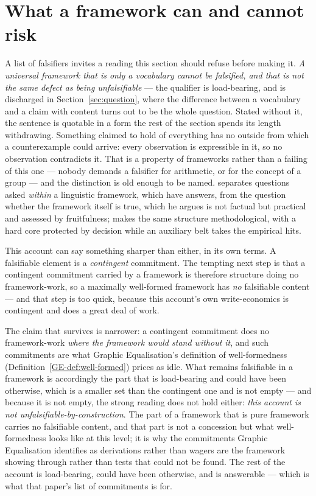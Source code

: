 \documentclass[11pt,a4paper]{article}
\begin{document}
\section{What a framework can and cannot risk}\label{sec:risk}
A list of falsifiers invites a reading this section
should refuse before making it. \emph{A universal framework that is only a vocabulary cannot be
falsified, and that is not the same defect as being unfalsifiable} --- the qualifier is load-bearing,
and is discharged in Section~\ref{sec:question}, where the difference between a vocabulary and a claim with
content turns out to be the whole question. Stated without it, the sentence is quotable in a form the rest of the section spends its length withdrawing. Something claimed to hold of everything has no outside from which
a counterexample could arrive: every observation is expressible in it, so no observation contradicts
it. That is a property of frameworks rather than a failing of this one --- nobody demands a falsifier
for arithmetic, or for the concept of a group --- and the distinction is old enough to be named.
\citet{carnap1950} separates questions asked \emph{within} a linguistic framework, which have answers,
from the question whether the framework itself is true, which he argues is not factual but practical
and assessed by fruitfulness; \citet{lakatos1970} makes the same structure methodological, with a hard
core protected by decision while an auxiliary belt takes the empirical hits.

This account can say something sharper than either, in its own terms. A falsifiable element is a \emph{contingent} commitment. The tempting next step
is that a contingent commitment carried by a framework is therefore structure doing no framework-work,
so a maximally well-formed framework has \emph{no} falsifiable content --- and that step is too quick,
because this account's own write-economics is contingent and does a great deal of work.

The claim that
survives is narrower: a contingent commitment does no framework-work \emph{where the framework would
stand without it}, and such commitments are what Graphic Equalisation's definition of well-formedness (Definition~\ref{GE-def:well-formed}) prices as idle. What
remains falsifiable in a framework is accordingly the part that is load-bearing and could have been
otherwise, which is a smaller set than the contingent one and is not empty --- and because it is not empty, the
strong reading does not hold either: \emph{this account is not unfalsifiable-by-construction}. The part of a framework that is pure framework carries no falsifiable content,
and that part is not a concession but what well-formedness looks like at this level; it is why the
commitments Graphic Equalisation identifies as derivations rather than wagers are the framework showing through
rather than tests that could not be found. The rest of the account is load-bearing, could have been
otherwise, and is answerable --- which is what that paper's list of commitments is for.
\end{document}
